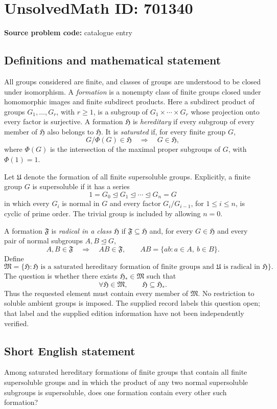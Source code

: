 \documentclass[11pt]{article}
\begin{document}
\section*{UnsolvedMath ID: 701340}
\textbf{Source problem code:} catalogue entry
\subsection{Definitions and mathematical statement}
All groups considered are finite, and classes of groups are understood to be closed under isomorphism. A \emph{formation} is a nonempty class of finite groups closed under homomorphic images and finite subdirect products. Here a subdirect product of groups \(G_1,\ldots,G_r\), with \(r\geq 1\), is a subgroup of \(G_1\times\cdots\times G_r\) whose projection onto every factor is surjective. A formation \(\mathfrak H\) is \emph{hereditary} if every subgroup of every member of \(\mathfrak H\) also belongs to \(\mathfrak H\). It is \emph{saturated} if, for every finite group \(G\),
\[
G/\Phi(G)\in\mathfrak H\quad\Longrightarrow\quad G\in\mathfrak H,
\]
where \(\Phi(G)\) is the intersection of the maximal proper subgroups of \(G\), with \(\Phi(1)=1\).

Let \(\mathfrak U\) denote the formation of all finite supersoluble groups. Explicitly, a finite group \(G\) is supersoluble if it has a series
\[
1=G_0\trianglelefteq G_1\trianglelefteq\cdots\trianglelefteq G_n=G
\]
in which every \(G_i\) is normal in \(G\) and every factor \(G_i/G_{i-1}\), for \(1\leq i\leq n\), is cyclic of prime order. The trivial group is included by allowing \(n=0\).

A formation \(\mathfrak F\) is \emph{radical in a class \(\mathfrak H\)} if \(\mathfrak F\subseteq\mathfrak H\) and, for every \(G\in\mathfrak H\) and every pair of normal subgroups \(A,B\trianglelefteq G\),
\[
A,B\in\mathfrak F\quad\Longrightarrow\quad AB\in\mathfrak F,
\qquad AB=\{ab:a\in A,\ b\in B\}.
\]
Define
\[
\mathfrak M=\bigl\{\mathfrak H:\mathfrak H\text{ is a saturated hereditary formation of finite groups and }\mathfrak U\text{ is radical in }\mathfrak H\bigr\}.
\]
The question is whether there exists \(\mathfrak H_{\ast}\in\mathfrak M\) such that
\[
\forall\mathfrak H\in\mathfrak M,\qquad \mathfrak H\subseteq\mathfrak H_{\ast}.
\]
Thus the requested element must contain every member of \(\mathfrak M\). No restriction to soluble ambient groups is imposed. The supplied record labels this question open; that label and the supplied edition information have not been independently verified.
\subsection{Short English statement}
Among saturated hereditary formations of finite groups that contain all finite supersoluble groups and in which the product of any two normal supersoluble subgroups is supersoluble, does one formation contain every other such formation?
\end{document}
